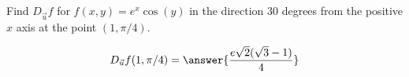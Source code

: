 \documentclass{ximera}
\author{David Guichard \and Neal Koblitz \and H. Jerome Keisler \and Albert Scheller \and Barry Balof \and Mike Wills \and Matthew Carr}
\begin{document}
\begin{exercise}




Find $D_{\vec{u}} f$ for $f(x,y)=e^{x}\cos(y)$ in the direction $30$ degrees from the positive $x$ axis at the point $(1,\pi/4)$. 
\begin{prompt}
\[
D_{\vec{u}}f(1,\pi/4)=\answer{\frac{e\sqrt{2}(\sqrt{3}-1)}{4}}
\]
\end{prompt}

\end{exercise}
\end{document}
